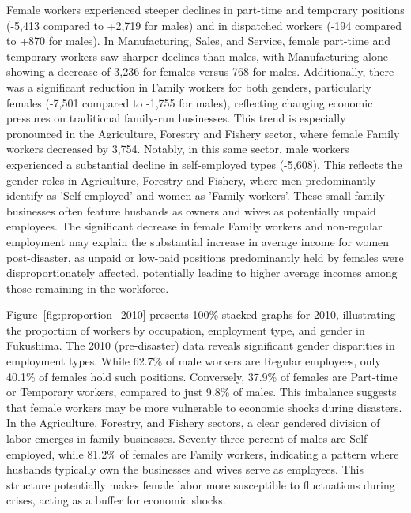 \documentclass[a4paper,12pt]{article}
\begin{document}
Female workers experienced steeper declines in part-time and temporary positions (-5,413 compared to +2,719 for males) and in dispatched workers (-194 compared to +870 for males). In Manufacturing, Sales, and Service, female part-time and temporary workers saw sharper declines than males, with Manufacturing alone showing a decrease of 3,236 for females versus 768 for males. Additionally, there was a significant reduction in Family workers for both genders, particularly females (-7,501 compared to -1,755 for males), reflecting changing economic pressures on traditional family-run businesses. This trend is especially pronounced in the Agriculture, Forestry and Fishery sector, where female Family workers decreased by 3,754. Notably, in this same sector, male workers experienced a substantial decline in self-employed types (-5,608). This reflects the gender roles in Agriculture, Forestry and Fishery, where men predominantly identify as 'Self-employed' and women as 'Family workers'. These small family businesses often feature husbands as owners and wives as potentially unpaid employees. The significant decrease in female Family workers and non-regular employment may explain the substantial increase in average income for women post-disaster, as unpaid or low-paid positions predominantly held by females were disproportionately affected, potentially leading to higher average incomes among those remaining in the workforce.

Figure~\ref{fig:proportion_2010} presents 100\% stacked graphs for 2010, illustrating the proportion of workers by occupation, employment type, and gender in Fukushima. The 2010 (pre-disaster) data reveals significant gender disparities in employment types. While 62.7\% of male workers are Regular employees, only 40.1\% of females hold such positions. Conversely, 37.9\% of females are Part-time or Temporary workers, compared to just 9.8\% of males. This imbalance suggests that female workers may be more vulnerable to economic shocks during disasters. In the Agriculture, Forestry, and Fishery sectors, a clear gendered division of labor emerges in family businesses. Seventy-three percent of males are Self-employed, while 81.2\% of females are Family workers, indicating a pattern where husbands typically own the businesses and wives serve as employees. This structure potentially makes female labor more susceptible to fluctuations during crises, acting as a buffer for economic shocks.
\end{document}
